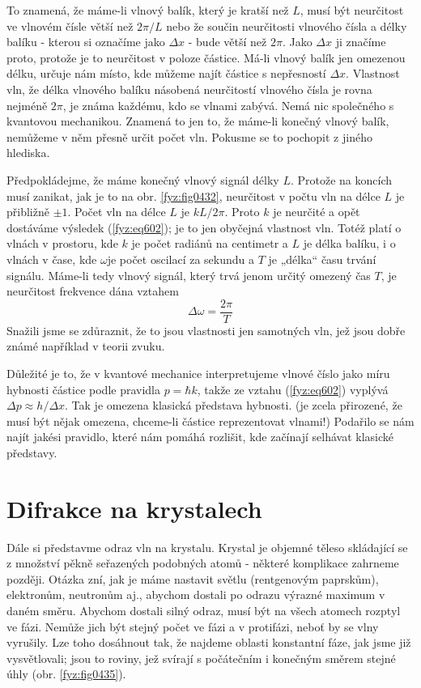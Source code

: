     To znamená, že máme-li vlnový balík, který je kratší než \(L\), musí být neurčitost ve vlnovém
    čísle větší než \(2π/L\) nebo že součin neurčitosti vlnového čísla a délky balíku - kterou si
    označíme jako \(\Delta x\) - bude větší než \(2π\). Jako \(\Delta x\)  ji značíme proto,
    protože je to neurčitost v poloze částice. Má-li vlnový balík jen omezenou délku, určuje nám
    místo, kde můžeme najít částice s nepřesností \(\Delta x\). Vlastnost vln, že délka vlnového
    balíku násobená neurčitostí vlnového čísla je rovna nejméně \(2π\), je známa každému, kdo se
    vlnami zabývá. Nemá nic společného s kvantovou mechanikou. Znamená to jen to, že máme-li konečný
    vlnový balík, nemůžeme v něm přesně určit počet vln. Pokusme se to pochopit z jiného hlediska.

    Předpokládejme, že máme konečný vlnový signál délky \(L\). Protože na koncích musí zanikat, jak
    je to na obr. \ref{fyz:fig0432}, neurčitost v počtu vln na délce \(L\) je přibližně \(\pm1\).
    Počet vln na délce \(L\) je \(kL/2π\). Proto \(k\) je neurčité a opět dostáváme výsledek
    (\ref{fyz:eq602}); je to jen obyčejná vlastnost vln. Totéž platí o vlnách v prostoru, kde \(k\)
    je počet radiánů na centimetr a \(L\) je délka balíku, i o vlnách v čase, kde \(\omega\)je počet
    oscilací za sekundu a \(T\) je „délka“ času trvání signálu. Máme-li tedy vlnový signál, který
    trvá jenom určitý omezený čas \(T\), je neurčitost frekvence dána vztahem
    \begin{equation}\label{fyz:eq603}
      Δω = \frac{2π}{T}
    \end{equation} 
    Snažili jsme se zdůraznit, že to jsou vlastnosti jen samotných vln, jež jsou dobře známé
    například v teorii zvuku.

    Důležité je to, že v kvantové mechanice interpretujeme vlnové číslo jako míru hybnosti částice
    podle pravidla \(p=ℏk\), takže ze vztahu (\ref{fyz:eq602}) vyplývá \(Δp≈h/Δx\). Tak je
    omezena klasická představa hybnosti. (je zcela přirozené, že musí být nějak omezena, chceme-li
    částice reprezentovat vlnami!) Podařilo se nám najít jakési pravidlo, které nám pomáhá rozlišit,
    kde začínají selhávat klasické představy.

  \section{Difrakce na krystalech}\label{fyz:IchapXXXVIIIsecIII}
    Dále si představme odraz vln na krystalu. Krystal je objemné těleso skládající se z množství
    pěkně seřazených podobných atomů - některé komplikace zahrneme později. Otázka zní, jak je máme
    nastavit světlu (rentgenovým paprskům), elektronům, neutronům aj., abychom dostali po odrazu
    výrazné maximum v daném směru. Abychom dostali silný odraz, musí být na všech atomech rozptyl ve
    fázi. Nemůže jich být stejný počet ve fázi a v protifázi, neboť by se vlny vyrušily. Lze toho
    dosáhnout tak, že najdeme oblasti konstantní fáze, jak jsme již vysvětlovali; jsou to roviny,
    jež svírají s počátečním i konečným směrem stejné úhly (obr. \ref{fyz:fig0435}). 
    
